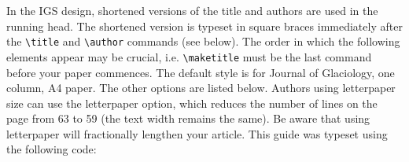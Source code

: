 \documentclass[twocolumn]{igs}
\begin{document}
In the IGS design, shortened versions of the title and authors are used in the running head. The shortened version is typeset in square braces immediately after the \verb"\title" and \verb"\author" commands (see below). The order in which the following elements appear may be crucial, i.e. \verb"\maketitle" must be the last command before your paper commences. The default style is for Journal of Glaciology, one column, A4 paper. The other options are listed below. Authors using letterpaper size can use the letterpaper option, which reduces the number of lines on the page from 63 to 59 (the text width remains the same). Be aware that using letterpaper will fractionally lengthen your article. This guide was typeset using the following code:
\end{document}
